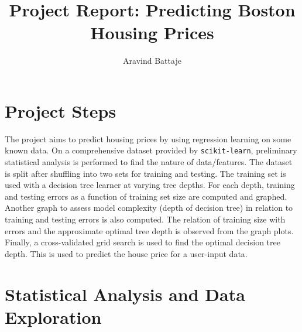 \documentclass{article}
\begin{document}
	
	\title{Project Report: Predicting Boston Housing Prices}
	\author{Aravind Battaje}
	\maketitle
	\section{Project Steps}
	The project aims to predict housing prices by using regression learning on some known data. On a comprehensive dataset provided by \texttt{scikit-learn}, preliminary statistical analysis is performed to find the nature of data/features. The dataset is split after shuffling into two sets for training and testing. The training set is used with a decision tree learner at varying tree depths. For each depth, training and testing errors as a function of training set size are computed and graphed. Another graph to assess model complexity (depth of decision tree) in relation to training and testing errors is also computed. The relation of training size with errors and the approximate optimal tree depth is observed from the graph plots. Finally, a cross-validated grid search is used to find the optimal decision tree depth. This is used to predict the house price for a user-input data.
	\section{Statistical Analysis and Data Exploration}
\end{document}
